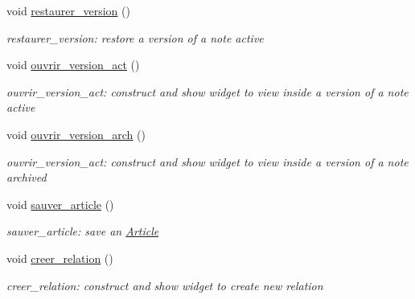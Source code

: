\begin{DoxyCompactItemize}
void \hyperlink{class_interface_ab4cdf89b7b6c8120c44625356a4987c1}{restaurer\+\_\+version} ()
\begin{DoxyCompactList}\small\item\em restaurer\+\_\+version\+: restore a version of a note active \end{DoxyCompactList}\item 
\mbox{\label{class_interface_abb959eacc914a6618e9f4741b42706f7}} 
void \hyperlink{class_interface_abb959eacc914a6618e9f4741b42706f7}{ouvrir\+\_\+version\+\_\+act} ()
\begin{DoxyCompactList}\small\item\em ouvrir\+\_\+version\+\_\+act\+: construct and show widget to view inside a version of a note active \end{DoxyCompactList}\item 
\mbox{\label{class_interface_a81f01e8dec044f52338b2f650fa48bde}} 
void \hyperlink{class_interface_a81f01e8dec044f52338b2f650fa48bde}{ouvrir\+\_\+version\+\_\+arch} ()
\begin{DoxyCompactList}\small\item\em ouvrir\+\_\+version\+\_\+act\+: construct and show widget to view inside a version of a note archived \end{DoxyCompactList}\item 
\mbox{\label{class_interface_a3a3d220b32fa6e4dda6f17f1899d1882}} 
void \hyperlink{class_interface_a3a3d220b32fa6e4dda6f17f1899d1882}{sauver\+\_\+article} ()
\begin{DoxyCompactList}\small\item\em sauver\+\_\+article\+: save an \hyperlink{class_article}{Article} \end{DoxyCompactList}\item 
\mbox{\label{class_interface_aaf757b3c67a42c5c42e0fd993ed2eb0e}} 
void \hyperlink{class_interface_aaf757b3c67a42c5c42e0fd993ed2eb0e}{creer\+\_\+relation} ()
\begin{DoxyCompactList}\small\item\em creer\+\_\+relation\+: construct and show widget to create new relation \end{DoxyCompactList}\item 
\mbox{\label{class_interface_addd6497067b6e680dee59e00726ea22e}} 

\end{DoxyCompactItemize}
